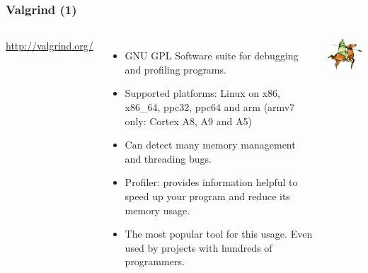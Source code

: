 \begin{frame}
  \frametitle{Valgrind (1)}
  \begin{columns}[T]
    \url{http://valgrind.org/}
    \begin{itemize}
    \item GNU GPL Software suite for debugging and profiling programs.
    \item Supported platforms: Linux on x86, x86\_64, ppc32, ppc64 and
      arm (armv7 only: Cortex A8, A9 and A5)
    \item Can detect many memory management and threading bugs.
    \item Profiler: provides information helpful to speed up your
      program and reduce its memory usage.
    \item The most popular tool for this usage. Even used by projects
      with hundreds of programmers.
    \end{itemize}
    \includegraphics[width=\textwidth]{slides/sysdev-application-development/valgrind1.png}
  \end{columns}
\end{frame}

